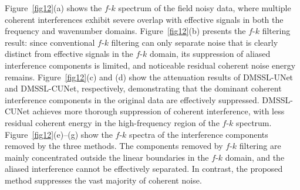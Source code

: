 \documentclass[alpha-refs]{wiley-article}
\begin{document}
Figure~\ref{fig12}(a) shows the $f$-$k$ spectrum of the field noisy data, where multiple 
coherent interferences exhibit severe overlap with effective signals in both the frequency 
and wavenumber domains. Figure~\ref{fig12}(b) presents the $f$-$k$ filtering result: since 
conventional $f$-$k$ filtering can only separate noise that is clearly distinct from effective 
signals in the $f$-$k$ domain, its suppression of aliased interference components is limited, 
and noticeable residual coherent noise energy remains. Figure~\ref{fig12}(c) and (d) show 
the attenuation results of DMSSL-UNet and DMSSL-CUNet, respectively, demonstrating that 
the dominant coherent interference components in the original data are effectively 
suppressed. DMSSL-CUNet achieves more thorough 
suppression of coherent interference, with less residual coherent energy in the 
high-frequency region of the $f$-$k$ spectrum. Figure~\ref{fig12}(e)--(g) show the 
$f$-$k$ spectra of the interference components removed by the three methods. The components 
removed by $f$-$k$ filtering are mainly concentrated 
outside the linear boundaries in the $f$-$k$ domain, and the aliased interference cannot be 
effectively separated. In contrast, the proposed method suppresses the vast majority of 
coherent noise.
\end{document}
